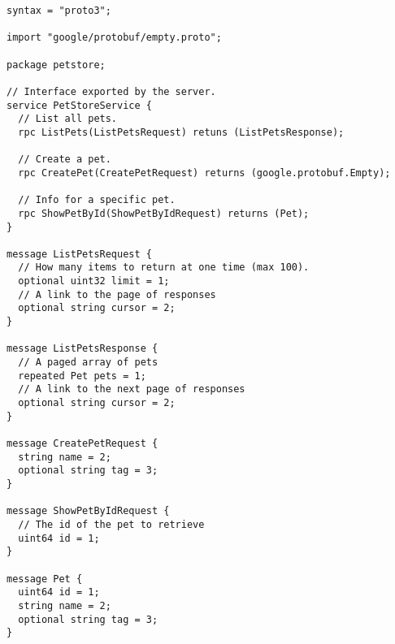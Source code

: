 \begin{verbatim}
syntax = "proto3";

import "google/protobuf/empty.proto";

package petstore;

// Interface exported by the server.
service PetStoreService {
  // List all pets.
  rpc ListPets(ListPetsRequest) retuns (ListPetsResponse);

  // Create a pet.
  rpc CreatePet(CreatePetRequest) returns (google.protobuf.Empty);

  // Info for a specific pet.
  rpc ShowPetById(ShowPetByIdRequest) returns (Pet);
}

message ListPetsRequest {
  // How many items to return at one time (max 100).
  optional uint32 limit = 1;
  // A link to the page of responses
  optional string cursor = 2;
}

message ListPetsResponse {
  // A paged array of pets
  repeated Pet pets = 1;
  // A link to the next page of responses
  optional string cursor = 2;
}

message CreatePetRequest {
  string name = 2;
  optional string tag = 3;
}

message ShowPetByIdRequest {
  // The id of the pet to retrieve
  uint64 id = 1;
}

message Pet {
  uint64 id = 1;
  string name = 2;
  optional string tag = 3;
}
\end{verbatim}


